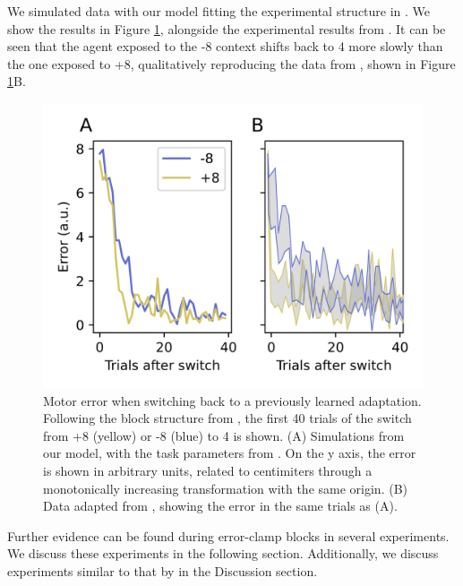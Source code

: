 \documentclass[a4paper,doc,floatsintext,natbib]{apa6}
\def \fref #1{Figure \ref{#1}}     %
\begin{document}
We simulated data with our model fitting the experimental structure in \cite{Davidson_Scaling_2004}. We show the results in \fref{fig:davidson-2004}, alongside the experimental results from \cite{Davidson_Scaling_2004}. It can be seen that the agent exposed to the -8 context shifts back to 4 more slowly than the one exposed to +8, qualitatively reproducing the data from \cite{Davidson_Scaling_2004}, shown in \fref{fig:davidson-2004}B.

\begin{figure}
\centering
\includegraphics{./figures/figure_3.png}
\caption{Motor error when switching back to a previously learned adaptation. Following the block structure from \cite{Davidson_Scaling_2004}, the first 40 trials of the switch from +8 (yellow) or -8 (blue) to 4 is shown. (A) Simulations from our model, with the task parameters from \cite{Davidson_Scaling_2004}. On the y axis, the error is shown in arbitrary units, related to centimiters through a monotonically increasing transformation with the same origin. (B) Data adapted from \cite{Davidson_Scaling_2004}, showing the error in the same trials as (A).}
\label{fig:davidson-2004}
\end{figure}

Further evidence can be found during error-clamp blocks in several experiments. We discuss these experiments in the following section. Additionally, we discuss experiments similar to that by \cite{Davidson_Scaling_2004} in the Discussion section.
\end{document}
